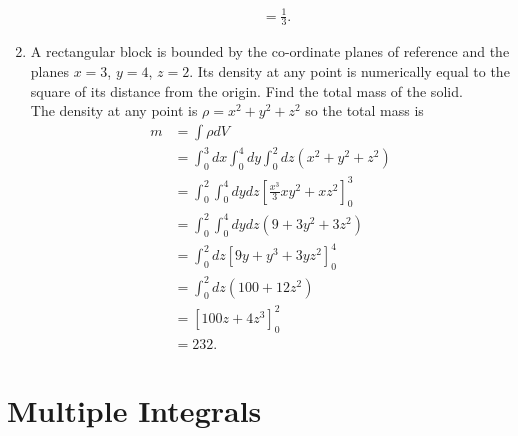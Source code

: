\documentclass{article}
\begin{document}
\begin{enumerate}
{\begin{align*}
			&= \frac{1}{3} .
		\end{align*}
	}
	\item{A rectangular block is bounded by the co-ordinate planes of reference and the planes $x = 3$, $y = 4$, $z = 2$. Its density at any point is numerically equal to the square of its distance from the origin. Find the total mass of the solid. \\
		The density at any point is $\rho = x^2 + y^2 + z^2$ so the total mass is
		\begin{align*}
			m &= \int \rho dV \\
			&= \int_0^3 dx \int_0^4 dy \int_0^2 dz  (x^2 + y^2 + z^2) \\
			&= \int_0^2 \int_0^4 dy dz \left[ \frac{x^3}{3} xy^2 + xz^2 \right]_0^3 \\
			&= \int_0^2 \int_0^4 dy dz (9 + 3y^2 + 3z^2) \\
			&= \int_0^2 dz \left[ 9y + y^3 + 3y z^2 \right]_0^4 \\
			&= \int_0^2 dz (100 + 12z^2) \\
			&= \left[ 100z + 4z^3 \right]_0^2 \\
			&= 232 .
		\end{align*}
	}
\end{enumerate}

\section{Multiple Integrals}
\end{document}
